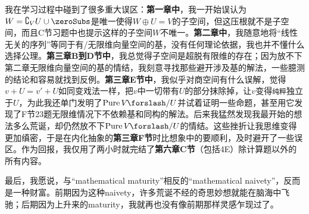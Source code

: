 {{\footnotesize 我在学习过程中碰到了很多重大误区：\textbf{第一章中}，我一开始误认为$W=\complement_V U\cup\def\envFont{\footnotesize}\zeroSubs$是唯一使得$W\oplus U=V$的子空间，但这压根就不是子空间，而且C节习题中也提示这样的子空间$W$不唯一。\textbf{第二章中}，我随意地将“线性无关的序列”等同于有/无限维向量空间的基，没有任何理论依据，我也并不懂什么选择公理。\textbf{第三章B到D节中}，我总觉得子空间是超脱有限维的存在；因为放不下第二章无限维向量空间的基的情结，我刻意寻找那些避开涉及基的解法，一些臆测的结论和容易就找到反例。\textbf{第三章E节中}，我似乎对商空间有什么误解，觉得$v+U=v'+U$如同变戏法一样，把$v$中一切带有$U$的部分抹除掉，让$v$变得\texttt{纯粹}独立于$U$，为此我还单门发明了$\text{Pure}\,V\XSlash U$并试着证明一些命题，甚至用它发现了F节23题无限维情况下不依赖基和同构的解法。后来我猛然发现我最开始的想法多么荒诞，却仍然放不下$\text{Pure}\,V\XSlash U$的情结。这些挫折让我思维变得更加缜密，于是在内化抽象的\textbf{第三章F节}时比想象中的要顺利，及时避开了一些误区。作为回报，我仅用了两小时就完结了\textbf{第六章C节}\!（包括4E）\!除计算题以外的所有内容。\par\vspace{4pt}
{\small 最后，我愿说，与“mathematical maturity”相反的“mathematical naivety”，反而是一种财富。前期因为这种naivety，许多荒诞不经的奇思妙想就能在脑海中飞驰；后期因为上升来的maturity，我就再也没有像前期那样灵感乍现过了。}
}\par\vspace{4pt}
}
\pagebreak

%

